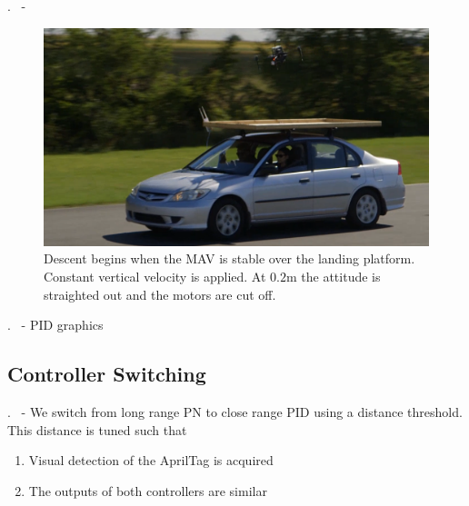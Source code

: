 
\begin{frame}{\thesection. \insertsection \ - \insertsubsection}
	\begin{figure}
		\includegraphics[width=0.7\paperwidth]{figures/landing.png}
		\caption{Descent begins when the MAV is stable over the landing platform. Constant vertical 
		velocity is applied. At $0.2$m the attitude is straighted out and the motors are cut off.}
	\end{figure}
\end{frame}


\begin{frame}{\thesection. \insertsection \ - \insertsubsection}
	PID graphics
\end{frame}


\subsection{Controller Switching}
\begin{frame}{\thesection. \insertsection \ - \insertsubsection}
	We switch from long range PN to close range PID using a distance threshold. This distance
	is tuned such that
	\begin{enumerate}
		\item Visual detection of the AprilTag is acquired
		\item The outputs of both controllers are similar
	\end{enumerate}
	
\end{frame}

